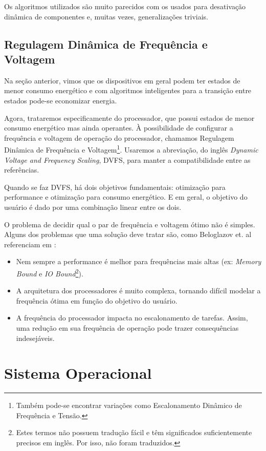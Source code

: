 Os algoritmos utilizados são muito parecidos com os usados para desativação dinâmica de componentes e, muitas vezes, generalizações triviais.

\subsection{Regulagem Dinâmica de Frequência e Voltagem}

Na seção anterior, vimos que os dispositivos em geral podem ter estados de menor consumo energético e com algoritmos inteligentes para a transição entre estados pode-se economizar energia.

Agora, trataremos especificamente do processador, que possui estados de menor consumo energético mas ainda operantes. À possibilidade de configurar a frequência e voltagem de operação do processador, chamamos Regulagem Dinâmica de Frequência e Voltagem\footnote{Também pode-se encontrar variações como Escalonamento Dinâmico de Frequência e Tensão.}. Usaremos a abreviação, do inglês \emph{Dynamic Voltage and Frequency Scaling}, DVFS, para manter a compatibilidade entre as referências.

Quando se faz DVFS, há dois objetivos fundamentais: otimização para performance e otimização para consumo energético. E em geral, o objetivo do usuário é dado por uma combinação linear entre os dois.

O problema de decidir qual o par de frequência e voltagem ótimo não é simples. Alguns dos problemas que uma solução deve tratar são, como Beloglazov et. al referenciam em \cite{beloglazov2011taxonomy}:
\begin{itemize}
    \item Nem sempre a performance é melhor para frequências mais altas (ex: \emph{Memory Bound} e \emph{IO Bound}\footnote{Estes termos não possuem tradução fácil e têm significados suficientemente precisos em inglês. Por isso, não foram traduzidos.}).
    \item A arquitetura dos processadores é muito complexa, tornando difícil modelar a frequência ótima em função do objetivo do usuário.
    \item A frequência do processador impacta no escalonamento de tarefas. Assim, uma redução em sua frequência de operação pode trazer consequências indesejáveis.
\end{itemize}

\section{Sistema Operacional}

